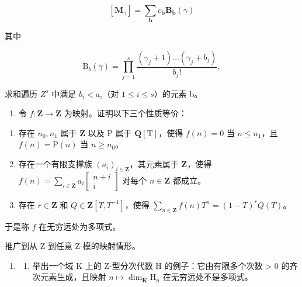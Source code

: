 \[
[ \mathbf {M} _ {\gamma} ] = \sum_ {\boldsymbol {b}} c _ {\boldsymbol {b}} \mathbf {B} _ {\boldsymbol {b}} (\gamma)
\]

其中

\[
\mathrm{B} _ {b} (\gamma) = \prod_ {j = 1} ^ {s} \frac {(\gamma_ {j} + 1) \dots (\gamma_ {j} + b _ {j})}{b _ {j} !},
\]

求和遍历 \(Z^{s}\) 中满足 \(b_{i} < a_{i}\)（对 \(1 \leqslant i \leqslant s\)）的元素 b。

\begin{enumerate}
\def\labelenumi{\arabic{enumi})}
\setcounter{enumi}{1}
\tightlist
\item
  令 \(f: \mathbf{Z} \to \mathbf{Z}\) 为映射。证明以下三个性质等价：
\end{enumerate}

\begin{enumerate}
\def\labelenumi{\alph{enumi})}
\item
  存在 \(n_0, n_1\) 属于 \(\mathbf{Z}\) 以及 \(\mathrm{P}\) 属于 \(\mathbf{Q}[\mathrm{T}]\)，使得 \(f(n) = 0\) 当 \(n \leqslant n_1\)，且 \(f(n) = \mathrm{P}(n)\) 当 \(n \geqslant n_0\)。
\item
  存在一个有限支撑族 \((a_i)_{i\in \mathbf{Z}}\)，其元素属于 \(\mathbf{Z}\)，使得 \(f(n) = \sum_{i\in \mathbf{Z}}a_i\left[ \begin{array}{cc}n + i\\ i \end{array} \right]\) 对每个 \(n\in \mathbf{Z}\) 都成立。
\item
  存在 \(r \in \mathbf{Z}\) 和 \(Q \in \mathbf{Z}[T, T^{-1}]\)，使得 \(\sum_{n \in \mathbf{Z}} f(n) T^n = (1 - T)^r Q(T)\)。
\end{enumerate}

于是称 \(f\) 在无穷远处为多项式。

推广到从 Z 到任意 Z-模的映射情形。

\begin{enumerate}
\def\labelenumi{\arabic{enumi})}
\setcounter{enumi}{2}
\tightlist
\item
  \begin{enumerate}
  \def\labelenumii{\alph{enumii})}
  \tightlist
  \item
    举出一个域 K 上的 Z-型分次代数 H 的例子：它由有限多个次数 \textgreater{} 0 的齐次元素生成，且映射 \(n \mapsto \dim_{\mathbf{K}} \mathrm{H}_{n}\) 在无穷远处不是多项式。
  \end{enumerate}
\end{enumerate}

